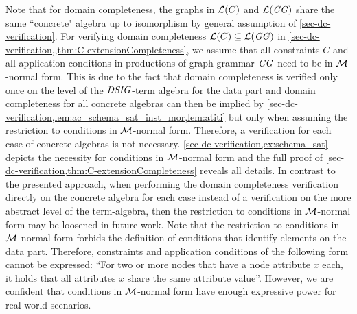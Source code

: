 Note that for domain completeness, the graphs in $\mathcal{L}(C)$ and $\mathcal{L}(\mathit{GG})$ share the same ``concrete" algebra up to isomorphism by general assumption of \cref{sec-dc-verification}.
For verifying domain completeness $\mathcal{L}(C) \subseteq \mathcal{L}(\mathit{GG})$ in \cref{sec-dc-verification,,thm:C-extensionCompleteness}, we assume that all constraints $C$ and all application conditions in productions of graph grammar $\mathit{GG}$ need to be in ${\cal M}$-normal form.
This is due to the fact that domain completeness is verified only once on the level of the $\mathit{DSIG}$-term algebra for the data part and domain completeness for all concrete algebras can then be implied by \cref{sec-dc-verification,lem:ac_schema_sat_inst_mor,lem:atiti} but only when assuming the restriction to conditions in ${\cal M}$-normal form.
Therefore, a verification for each case of concrete algebras is not necessary.
\cref{sec-dc-verification,ex:schema_sat} depicts the necessity for conditions in ${\cal M}$-normal form and the full proof of \cref{sec-dc-verification,thm:C-extensionCompleteness} reveals all details.
In contrast to the presented approach, when performing the domain completeness verification directly on the concrete algebra for each case instead of a verification on the more abstract level of the term-algebra, then the restriction to conditions in ${\cal M}$-normal form may be loosened in future work.
Note that the restriction to conditions in ${\cal M}$-normal form forbids the definition of conditions that identify elements on the data part.
Therefore, constraints and application conditions of the following form cannot be expressed: ``For two or more nodes that have a node attribute $x$ each, it holds that all attributes $x$ share the same attribute value''.
However, we are confident that conditions in ${\cal M}$-normal form have enough expressive power for real-world scenarios.

